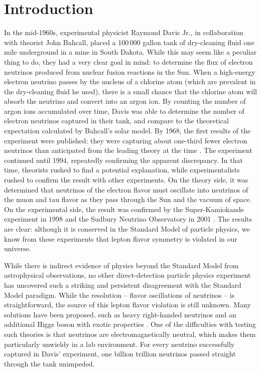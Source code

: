 \chapter{Introduction}
\label{introchap}


In the mid-1960s, experimental physicist Raymond Davis Jr., in collaboration with theorist John Bahcall, placed a 100\,000 gallon tank of dry-cleaning fluid one mile underground in a mine in South Dakota. While this may seem like a peculiar thing to do, they had a very clear goal in mind: to determine the flux of electron neutrinos produced from nuclear fusion reactions in the Sun. When a high-energy electron neutrino passes by the nucleus of a chlorine atom (which are prevalent in the dry-cleaning fluid he used), there is a small chance that the chlorine atom will absorb the neutrino and convert into an argon ion. By counting the number of argon ions accumulated over time, Davis was able to determine the number of electron neutrinos captured in their tank, and compare to the theoretical expectation calculated by Bahcall's solar model. By 1968, the first results of the experiment were published: they were capturing about one-third fewer electron neutrinos than anticipated from the leading theory at the time \cite{Bahcall:1964gx,Davis:1968cp}. The experiment continued until 1994, repeatedly confirming the apparent discrepancy. In that time, theorists rushed to find a potential explanation, while experimentalists rushed to confirm the result with other experiments. On the theory side, it was determined that neutrinos of the electron flavor must oscillate into neutrinos of the muon and tau flavor as they pass through the Sun and the vacuum of space. On the experimental side, the result was confirmed by the Super-Kamiokande experiment in 1998 \cite{Super-Kamiokande:1998kpq} and the Sudbury Neutrino Observatory in 2001 \cite{Oser:2001rh}. The results are clear: although it is conserved in the Standard Model of particle physics, we know from these experiments that lepton flavor symmetry is violated in our universe. 

 While there is indirect evidence of physics beyond the Standard Model from astrophysical observations, no other direct-detection particle physics experiment has uncovered such a striking and persistent disagreement with the Standard Model paradigm. While the resolution -- flavor oscillations of neutrinos -- is straightforward, the source of this lepton flavor violation is still unknown. Many solutions have been proposed, such as heavy right-handed neutrinos and an additional Higgs boson with exotic properties \cite{Minkowski:1977sc,Magg:1980ut}. One of the difficulties with testing such theories is that neutrinos are electromagnetically neutral, which makes them particularly unwieldy in a lab environment. For every neutrino successfully captured in Davis' experiment, one billion trillion neutrinos passed straight through the tank unimpeded.

